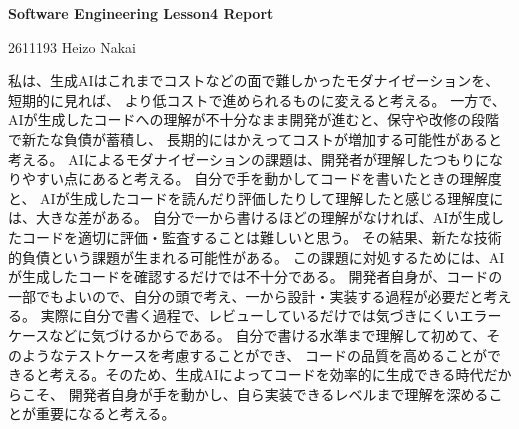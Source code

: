 \documentclass[11pt,a4paper]{ltjsarticle}
\begin{document}
\begin{center}
{\LARGE \textbf{Software Engineering Lesson4 Report}}
\end{center}
\vspace{1em}
\begin{flushright}
2611193 Heizo Nakai
\end{flushright}

私は、生成AIはこれまでコストなどの面で難しかったモダナイゼーションを、短期的に見れば、
より低コストで進められるものに変えると考える。
一方で、AIが生成したコードへの理解が不十分なまま開発が進むと、保守や改修の段階で新たな負債が蓄積し、
長期的にはかえってコストが増加する可能性があると考える。
AIによるモダナイゼーションの課題は、開発者が理解したつもりになりやすい点にあると考える。
自分で手を動かしてコードを書いたときの理解度と、
AIが生成したコードを読んだり評価したりして理解したと感じる理解度には、大きな差がある。
自分で一から書けるほどの理解がなければ、AIが生成したコードを適切に評価・監査することは難しいと思う。
その結果、新たな技術的負債という課題が生まれる可能性がある。
この課題に対処するためには、AIが生成したコードを確認するだけでは不十分である。
開発者自身が、コードの一部でもよいので、自分の頭で考え、一から設計・実装する過程が必要だと考える。
実際に自分で書く過程で、レビューしているだけでは気づきにくいエラーケースなどに気づけるからである。
自分で書ける水準まで理解して初めて、そのようなテストケースを考慮することができ、
コードの品質を高めることができると考える。そのため、生成AIによってコードを効率的に生成できる時代だからこそ、
開発者自身が手を動かし、自ら実装できるレベルまで理解を深めることが重要になると考える。
\end{document}
